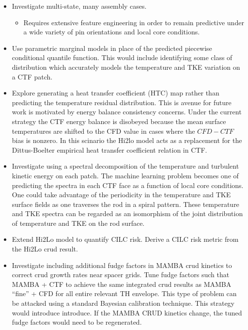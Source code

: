 \begin{itemize}
	\item  Investigate multi-state, many assembly cases.
	\begin{itemize}
		\item Requires extensive feature engineering in order to remain predictive under a wide variety of pin orientations and local core conditions.
	\end{itemize}
		
	\item Use parametric marginal models in place of the predicted piecewise conditional quantile function.  This would include identifying some class of distribution which accurately models the temperature and TKE variation on a CTF patch.
	
	\item Explore generating a heat transfer coefficient (HTC) map rather than predicting the temperature residual distribution.  This is avenue for future work is motivated by energy balance consistency concerns.  Under the current strategy the CTF energy balance is disobeyed because the mean surface temperatures are shifted to the CFD value in cases where the $CFD-CTF$ bias is nonzero.  In this scinario the Hi2lo model acts as a replacement for the Dittus-Boelter empirical heat transfer coefficient relation in CTF.
	
	\item Investigate using a spectral decomposition of the temperature and turbulent kinetic energy on each patch.  The machine learning problem becomes one of predicting the spectra in each CTF face as a function of local core conditions.  One could take advantage of the periodicity in the temperature and TKE surface fields as one traverses the rod in a spiral pattern.  These temperature and TKE spectra can be regarded as an isomorphism of the  joint distribution of temperature and TKE on the rod surface.
	
	\item Extend Hi2Lo model to quantify CILC risk.  Derive a CILC risk metric from the Hi2Lo crud result.
	
		\item Investigate including additional fudge factors in MAMBA crud kinetics to correct crud growth rates near spacer grids.  Tune fudge factors such that MAMBA + CTF to achieve the same integrated crud results as MAMBA ``fine'' + CFD for all entire relevant TH envelope.  This type of problem can be attacked using a standard Bayesian calibration technique.   This strategy would introduce introduce.  If the MAMBA CRUD kinetics change, the tuned fudge factors would need to be regenerated.
	
\end{itemize}
